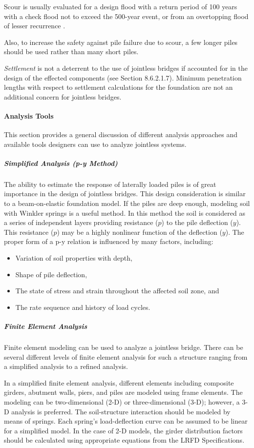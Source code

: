 Scour is usually evaluated for a design flood with a return period of 100 years with a check flood not to exceed the 500-year event, or from an overtopping flood of lesser recurrence \cite{aashto2012l}.

Also, to increase the safety against pile failure due to scour, a few longer piles should be used rather than many short piles.

\emph{Settlement} is not a deterrent to the use of jointless bridges if accounted for in the design of the effected components (see Section 8.6.2.1.7). Minimum penetration lengths with respect to settlement calculations for the
foundation are not an additional concern for jointless bridges.

\paragraph{Analysis Tools}
This section provides a general discussion of different analysis approaches and available tools designers can use to analyze jointless systems.

\subparagraph{Simplified Analysis (p-y Method)}
The ability to estimate the response of laterally loaded piles is of great importance in the design of jointless bridges. This design consideration is similar to a beam-on-elastic foundation model. If the piles are deep enough, modeling soil with Winkler springs is a useful method. In this method the soil is considered as a series of independent layers providing resistance ($p$) to the pile deflection ($y$). This resistance ($p$) may be a highly nonlinear function of the deflection ($y$). The proper form of a p-y relation is influenced by many factors, including:
\begin{itemize}
  \item Variation of soil properties with depth,
  \item Shape of pile deflection,
  \item The state of stress and strain throughout the affected soil zone, and
  \item The rate sequence and history of load cycles.
\end{itemize}

\subparagraph{Finite Element Analysis}
Finite element modeling can be used to analyze a jointless bridge. There can be several different levels of finite element analysis for such a structure ranging from a simplified analysis to a refined analysis.

In a simplified finite element analysis, different elements including composite girders, abutment walls, piers, and piles are modeled using frame elements. The modeling can be two-dimensional (2-D) or three-dimensional (3-D); however, a 3-D analysis is preferred. The soil-structure interaction should be modeled by means of springs. Each spring’s load-deflection curve can be assumed to be linear for a simplified model. In the case of 2-D models, the girder distribution factors should be calculated using appropriate equations from the LRFD Specifications.

